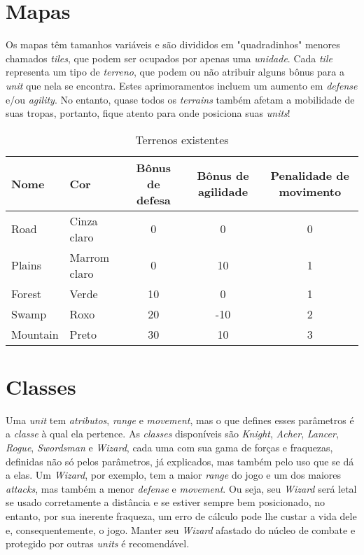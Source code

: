 \documentclass{article}
\begin{document}
\section{Mapas}
Os mapas têm tamanhos variáveis e são divididos em "quadradinhos" menores chamados \emph{tiles}, que podem ser ocupados por apenas uma \emph{unidade}. Cada \emph{tile} representa um tipo de \emph{terreno}, que podem ou não atribuir alguns bônus para a \emph{unit} que nela se encontra. Estes aprimoramentos incluem um aumento em \emph{defense} e/ou \emph{agility}. No entanto, quase todos os \emph{terrains} também afetam a mobilidade de suas tropas, portanto, fique atento para onde posiciona suas \emph{units}!

\begin{table}[H]
\centering
\begin{tabular}{|l|l|c|c|c|}\hline
 \textbf{Nome} & \textbf{Cor} & \textbf{Bônus de defesa} & \textbf{Bônus de agilidade} & \textbf{Penalidade de movimento}\\\hline
 Road     & Cinza claro  &  0 &   0 & 0 \\\hline
 Plains   & Marrom claro &  0 &  10 & 1 \\\hline
 Forest   & Verde        & 10 &   0 & 1 \\\hline
 Swamp    & Roxo         & 20 & -10 & 2 \\\hline
 Mountain & Preto        & 30 &  10 & 3 \\\hline
\end{tabular}
\caption{Terrenos existentes}
\end{table}

\section{Classes}
Uma \emph{unit} tem \emph{atributos}, \emph{range} e \emph{movement}, mas o que defines esses parâmetros é a \emph{classe} à qual ela pertence. As \emph{classes} disponíveis são \emph{Knight}, \emph{Acher}, \emph{Lancer}, \emph{Rogue}, \emph{Swordsman} e \emph{Wizard}, cada uma com sua gama de forças e fraquezas, definidas não só pelos parâmetros, já explicados, mas também pelo uso que se dá a elas. Um \emph{Wizard}, por exemplo, tem a maior \emph{range} do jogo e um dos maiores \emph{attacks}, mas também a menor \emph{defense} e \emph{movement}. Ou seja, seu \emph{Wizard} será letal se usado corretamente a distância e se estiver sempre bem posicionado, no entanto, por sua inerente fraqueza, um erro de cálculo pode lhe custar a vida dele e, consequentemente, o jogo. Manter seu \emph{Wizard} afastado do núcleo de combate e protegido por outras \emph{units} é recomendável. 
\end{document}
